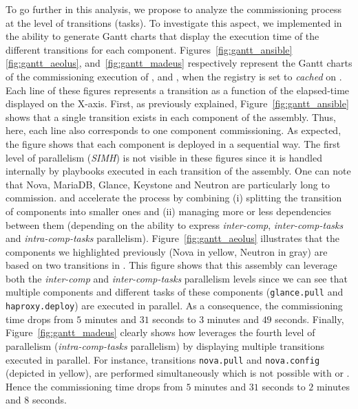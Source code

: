 To go further in this analysis, we propose to analyze the
commissioning process at the level of transitions (\ie tasks). To
investigate this aspect, we implemented in \mad the ability to
generate Gantt charts that display the execution time of the different
transitions for each component.
Figures~\ref{fig:gantt_ansible} \ref{fig:gantt_aeolus},
and~\ref{fig:gantt_madeus} respectively represent the Gantt charts of
the commissioning execution of \ansass, \aeoass and \madass, when the
registry is set to \emph{cached} on \ecotype. Each line of these
figures represents a transition as a function of the elapsed-time
displayed on the X-axis.  First, as previously explained,
Figure~\ref{fig:gantt_ansible} shows that a single transition exists
in each component of the \ansass assembly. Thus, here, each line also
corresponds to one component commissioning. As expected, the figure
shows that each component is deployed in a sequential way. The first
level of parallelism (\ie \emph{SIMH}) is not visible in these figures
since it is handled internally by \ansible playbooks executed in each
transition of the assembly. One can note that Nova, MariaDB, Glance,
Keystone and Neutron are particularly long to commission. \aeoass and
\madass accelerate the process by combining (i) splitting the
transition of components into smaller ones and (ii) managing more or
less dependencies between them (depending on the ability to express
\emph{inter-comp}, \emph{inter-comp-tasks} and \emph{intra-comp-tasks}
parallelism).
%
Figure~\ref{fig:gantt_aeolus} illustrates that the components we
highlighted previously (\eg Nova in yellow, Neutron in gray) are based
on two transitions in \aeoass. This figure shows that this assembly
can leverage both the \emph{inter-comp} and \emph{inter-comp-tasks}
parallelism levels since we can see that multiple components and
different tasks of these components (\eg \texttt{glance.pull} and
\texttt{haproxy.deploy}) are executed in parallel. As a consequence,
the commissioning time drops from $5$ minutes and $31$ seconds to $3$
minutes and $49$ seconds.
%
Finally, Figure~\ref{fig:gantt_madeus} clearly shows how \mad
leverages the fourth level of parallelism (\ie \emph{intra-comp-tasks}
parallelism) by displaying multiple transitions executed in
parallel. For instance, transitions \texttt{nova.pull} and
\texttt{nova.config} (depicted in yellow), are performed
simultaneously which is not possible with \ansible or \aeolus. Hence
the commissioning time drops from $5$ minutes and $31$ seconds to $2$
minutes and $8$ seconds.
%

